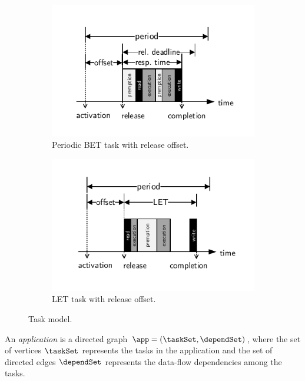 \begin{figure}
\centering
%
\begin{subfigure}[t]{0.45\textwidth}
	\includegraphics[trim=0.5cm 0.5cm 0.5cm 0.5cm, width=\textwidth]{fig/paper/model_task.pdf}
	\caption{Periodic BET task with release offset.}
	\label{fig:et_task}
\end{subfigure}
%
\hfill
%
\begin{subfigure}[t]{0.45\textwidth}
	\includegraphics[trim=0.5cm 0.5cm 0.5cm 0.5cm, width=\textwidth]{fig/paper/model_task_let.pdf}
	\caption{LET task with release offset.}
	\label{fig:let_task}
\end{subfigure}
%
\caption{Task model.}
\label{fig:task}
\end{figure}


An \emph{application} is a directed graph $\app = (\taskSet, \dependSet)$, where the set of vertices $\taskSet$ represents the tasks in the application and the set of directed edges $\dependSet$ represents the data-flow dependencies among the tasks.
\bigskip

